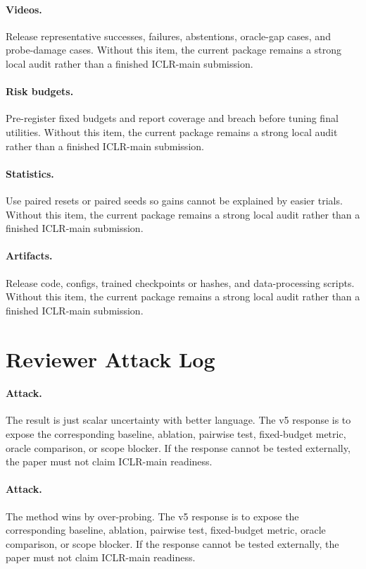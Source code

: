 \documentclass{article}
\begin{document}
\paragraph{Videos.} Release representative successes, failures, abstentions, oracle-gap cases, and probe-damage cases. Without this item, the current package remains a strong local audit rather than a finished ICLR-main submission.
\paragraph{Risk budgets.} Pre-register fixed budgets and report coverage and breach before tuning final utilities. Without this item, the current package remains a strong local audit rather than a finished ICLR-main submission.
\paragraph{Statistics.} Use paired resets or paired seeds so gains cannot be explained by easier trials. Without this item, the current package remains a strong local audit rather than a finished ICLR-main submission.
\paragraph{Artifacts.} Release code, configs, trained checkpoints or hashes, and data-processing scripts. Without this item, the current package remains a strong local audit rather than a finished ICLR-main submission.
\clearpage
\section{Reviewer Attack Log}
\paragraph{Attack.} The result is just scalar uncertainty with better language. The v5 response is to expose the corresponding baseline, ablation, pairwise test, fixed-budget metric, oracle comparison, or scope blocker. If the response cannot be tested externally, the paper must not claim ICLR-main readiness.
\paragraph{Attack.} The method wins by over-probing. The v5 response is to expose the corresponding baseline, ablation, pairwise test, fixed-budget metric, oracle comparison, or scope blocker. If the response cannot be tested externally, the paper must not claim ICLR-main readiness.
\end{document}
